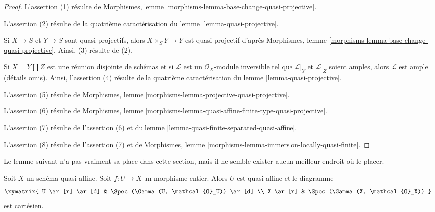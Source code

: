 \begin{proof}
L'assertion (1) résulte de Morphismes, lemme
\ref{morphisms-lemma-base-change-quasi-projective}.

\medskip\noindent
L'assertion (2) résulte de la quatrième caractérisation du
lemme \ref{lemma-quasi-projective}.

\medskip\noindent
Si $X \to S$ et $Y \to S$ sont quasi-projectifs, alors
$X \times_S Y \to Y$ est quasi-projectif d'après
Morphismes, lemme \ref{morphisms-lemma-base-change-quasi-projective}.
Ainsi, (3) résulte de (2).

\medskip\noindent
Si $X = Y \amalg Z$ est une réunion disjointe de schémas
et si $\mathcal{L}$ est un $\mathcal{O}_X$-module inversible
tel que $\mathcal{L}|_Y$ et $\mathcal{L}|_Z$ soient amples, alors
$\mathcal{L}$ est ample (détails omis). Ainsi,
l'assertion (4) résulte de la quatrième caractérisation du
lemme \ref{lemma-quasi-projective}.

\medskip\noindent
L'assertion (5) résulte de
Morphismes, lemme \ref{morphisms-lemma-projective-quasi-projective}.

\medskip\noindent
L'assertion (6) résulte de
Morphismes, lemme
\ref{morphisms-lemma-quasi-affine-finite-type-quasi-projective}.

\medskip\noindent
L'assertion (7) résulte de l'assertion (6) et du
lemme \ref{lemma-quasi-finite-separated-quasi-affine}.

\medskip\noindent
L'assertion (8) résulte de l'assertion (7) et de
Morphismes, lemme \ref{morphisms-lemma-immersion-locally-quasi-finite}.
\end{proof}

\noindent
Le lemme suivant n'a pas vraiment sa place dans cette section, mais
il ne semble exister aucun meilleur endroit où le placer.

\begin{lemma}
\label{lemma-integral-over-quasi-affine}
Soit $X$ un schéma quasi-affine. Soit $f : U \to X$ un morphisme
entier. Alors $U$ est quasi-affine et le diagramme
$$
\xymatrix{
U \ar[r] \ar[d] & \Spec(\Gamma(U, \mathcal{O}_U)) \ar[d] \\
X \ar[r] & \Spec(\Gamma(X, \mathcal{O}_X))
}
$$
est cartésien.
\end{lemma}

